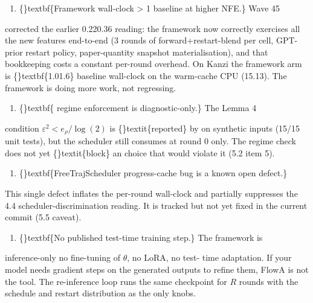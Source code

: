 \documentclass{article}
\begin{document}
\begin{enumerate}
\item \{\}textbf\{Framework wall-clock > 1 baseline at higher NFE.\} Wave 45
\end{enumerate}
corrected the earlier 0.220.36 reading: the framework now correctly exercises all the new features end-to-end (3 rounds of forward+restart-blend per cell, GPT-prior restart policy, paper-quantity snapshot materialisation), and that bookkeeping costs a constant per-round overhead. On Kanzi the framework arm is \{\}textbf\{1.01.6\} baseline wall-clock on the warm-cache CPU (15.13). The framework is doing more work, not regressing.

\begin{enumerate}
\item \{\}textbf\{ regime enforcement is diagnostic-only.\} The Lemma 4
\end{enumerate}
\sloppy condition $\varepsilon^2 < e_\rho / \log(2)$ is \{\}textit\{reported\} by  on synthetic inputs (15/15 unit tests), but the scheduler still consumes  at round 0 only. The regime check does not yet \{\}textit\{block\} an  choice that would violate it (5.2 item 5).

\begin{enumerate}
\item \{\}textbf\{FreeTrajScheduler progress-cache bug is a known open defect.\}
\end{enumerate}
This single defect inflates the per-round wall-clock and partially suppresses the 4.4 scheduler-discrimination reading. It is tracked but not yet fixed in the current commit (5.5 caveat).

\begin{enumerate}
\item \{\}textbf\{No published test-time training step.\} The framework is
\end{enumerate}
inference-only  no fine-tuning of $\theta$, no LoRA, no test- time adaptation. If your model needs gradient steps on the generated outputs to refine them, FlowA is not the tool. The re-inference loop runs the same checkpoint for $R$ rounds with the schedule and restart distribution as the only knobs.
\end{document}
